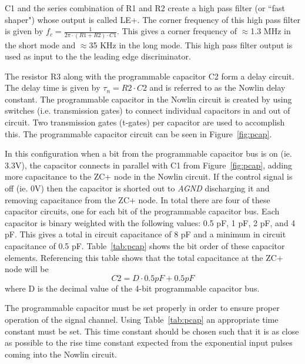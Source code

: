 \documentclass[12pt,oneside,final]{siuethesis}
\theoremstyle{definition}
\begin{document}
\par C1 and the series combination of R1 and R2 create a high pass filter (or ``fast shaper") whose output is called LE+. The corner frequency of this high pass filter is given by $f_{c} = \frac{1}{2\pi \cdot(R1 + R2)\cdot C1}$. This gives a corner frequency of $\approx$1.3 MHz in the short mode and $\approx$35 KHz in the long mode. This high pass filter output is used as input to the the leading edge discriminator. 
\par The resistor R3 along with the programmable capacitor C2 form a delay circuit. The delay time is given by $\tau_{n} = R2 \cdot C2$ and is referred to as the Nowlin delay constant. The programmable capacitor in the Nowlin circuit is created by using switches (i.e. transmission gates) to connect individual capacitors in and out of circuit. Two transmission gates (t-gates) per capacitor are used to accomplish this. The programmable capacitor circuit can be seen in Figure~\ref{fig:pcap}.
\par In this configuration when a bit from the programmable capacitor bus is on (ie. 3.3V), the capacitor connects in parallel with C1 from Figure~\ref{fig:pcap}, adding more capacitance to the ZC+ node in the Nowlin circuit. If the control signal is off (ie. 0V) then the capacitor is shorted out to \emph{AGND} discharging it and removing capacitance from the ZC+ node. In total there are four of these capacitor circuits, one for each bit of the programmable capacitor bus. Each capacitor is binary weighted with the following values: 0.5 pF, 1 pF, 2 pF, and 4 pF. This gives a total in circuit capacitance of 8 pF and a minimum in circuit capacitance of 0.5 pF. Table~\ref{tab:pcap} shows the bit order of these capacitor elements. Referencing this table shows that the total capacitance at the ZC+ node will be \begin{equation}
C2 = D \cdot 0.5 pF + 0.5 pF
\end{equation} 
where D is the decimal value of the 4-bit programmable capacitor bus.
\par The programmable capacitor must be set properly in order to ensure proper operation of the signal channel. Using Table~\ref{tab:pcap} an appropriate time constant must be set. This time constant should be chosen such that it is as close as possible to the rise time constant expected from the exponential input pulses coming into the Nowlin circuit.
\end{document}
